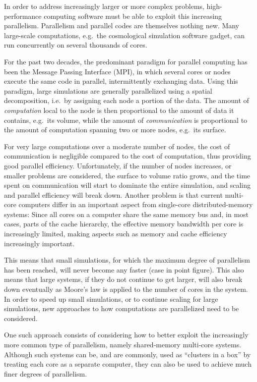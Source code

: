 \documentclass[final]{siamltex}
\begin{document}
In order to address increasingly larger
or more complex problems, high-performance computing software
must be able to exploit this increasing parallelism.
Parallelism and parallel codes are themselves nothing new.
Many large-scale computations, e.g.~the cosmological
simulation software {\sc gadget}, can run concurrently
on several thousands of cores.

For the past two decades, the predominant paradigm for parallel
computing has been the Message Passing Interface (MPI),
in which several cores or nodes execute the same code
in parallel, intermittently exchanging data.
Using this paradigm, large simulations are generally
parallelized using a spatial decomposition, i.e.~by assigning
each node a portion of the data.
The amount of {\em computation} local to the node is then proportional
to the amount of data it contains, e.g.~its volume, while
the amount of {\em communication} is proportional to the
amount of computation spanning two or more nodes, e.g.~its
surface.

For very large computations over a moderate number of nodes,
the cost of communication is negligible compared to the
cost of computation, thus providing good parallel efficiency.
Unfortunately, if the number of nodes increases, or 
smaller problems are considered, the surface to volume ratio
grows, and the time spent on communication will start to
dominate the entire simulation, and scaling and parallel
efficiency will break down.
Another problem is that current multi-core computers
differ in an important aspect from single-core distributed-memory
systems: Since all cores on a computer share the same memory
bus and, in most cases, parts of the cache hierarchy,
the effective memory bandwidth per core is increasingly
limited, making aspects such as memory and cache efficiency
increasingly important.

This means that small simulations, for which the
maximum degree of parallelism has been reached, will never
become any faster (case in point figure).
This also means that large systems, if they do not continue
to get larger, will also break down eventually as Moore's law
is applied to the number of cores in the system.
In order to speed up small simulations, or to continue
scaling for large simulations, new approaches to how
computations are parallelized need to be considered.

One such approach consists of considering how to better exploit the
increasingly more common type of parallelism, namely shared-memory
multi-core systems.
Although such systems can be, and are commonly, used as
``clusters in a box'' by treating each core as a separate
computer, they can also be used to achieve much finer
degrees of parallelism.
\end{document}
